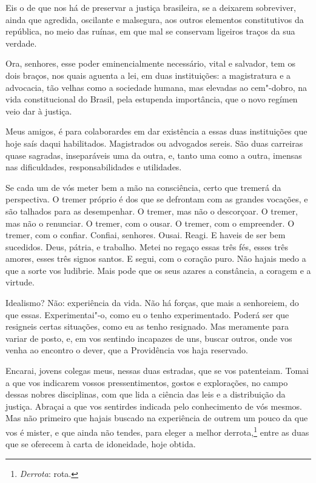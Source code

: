 Eis o de que nos há de preservar a justiça brasileira, se a
deixarem sobreviver, ainda que agredida, oscilante e malsegura, aos
outros elementos constitutivos da república, no meio das ruínas, em que
mal se conservam ligeiros traços da sua verdade.

Ora, senhores, esse poder eminencialmente necessário, vital e
salvador, tem os dois braços, nos quais aguenta a lei, em duas
instituições: a magistratura e a advocacia, tão velhas como a sociedade
humana, mas elevadas ao cem"-dobro, na vida constitucional do Brasil,
pela estupenda importância, que o novo regímen veio dar à justiça.

Meus amigos, é para colaborardes em dar existência a essas duas
instituições que hoje saís daqui habilitados. Magistrados ou advogados
sereis. São duas carreiras quase sagradas, inseparáveis uma da outra,
e, tanto uma como a outra, imensas nas dificuldades, responsabilidades
e utilidades.

Se cada um de vós meter bem a mão na consciência, certo que
tremerá da perspectiva. O tremer próprio é dos que se defrontam com as
grandes vocações, e são talhados para as desempenhar. O tremer, mas não
o descorçoar. O tremer, mas não o renunciar. O tremer, com o ousar. O
tremer, com o empreender. O tremer, com o confiar. Confiai, senhores.
Ousai. Reagi. E haveis de ser bem sucedidos. Deus, pátria, e trabalho.
Metei no regaço essas três fés, esses três amores, esses três signos
santos. E segui, com o coração puro. Não hajais medo a que a sorte vos
ludibrie. Mais pode que os seus azares a constância, a coragem e a virtude.

Idealismo? Não: experiência da vida. Não há forças, que mais a
senhoreiem, do que essas. Experimentai"-o, como eu o tenho
experimentado. Poderá ser que resigneis certas situações, como eu as
tenho resignado. Mas meramente para variar de posto, e, em vos sentindo
incapazes de uns, buscar outros, onde vos venha ao encontro o dever,
que a Providência vos haja reservado.

Encarai, jovens colegas meus, nessas duas estradas, que se vos
patenteiam. Tomai a que vos indicarem vossos pressentimentos, gostos e
explorações, no campo dessas nobres disciplinas, com que lida a ciência
das leis e a distribuição da justiça. Abraçai a que vos sentirdes
indicada pelo conhecimento de vós mesmos. Mas não primeiro que hajais
buscado na experiência de outrem um pouco da que vos é mister, e que
ainda não tendes, para eleger a melhor derrota,\footnote{ \textit{Derrota}:
rota.} entre as duas que se oferecem à carta de
idoneidade, hoje obtida.


